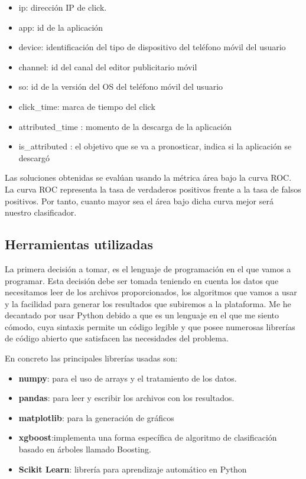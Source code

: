 \begin{itemize}
	
	\item ip: dirección IP de click.
	\item app: id de la aplicación
	\item device: identificación del tipo de dispositivo del teléfono móvil del usuario
	\item channel: id del canal del editor publicitario móvil
	\item so: id de la versión del OS del teléfono móvil del usuario
	\item click\_time: marca de tiempo del click 
	\item attributed\_time : momento de la descarga de la aplicación 
	\item is\_attributed : el objetivo que se va a pronosticar, indica si la aplicación se descargó
\end{itemize}

Las soluciones obtenidas se evalúan usando la métrica área bajo la curva ROC.
\medskip
La curva ROC representa la tasa de verdaderos positivos frente a la tasa de falsos positivos. Por tanto, cuanto mayor sea el área bajo dicha curva mejor será nuestro clasificador.


\subsection{Herramientas utilizadas}
La primera decisión a tomar, es el lenguaje de programación en el que vamos a programar. Esta decisión debe ser tomada teniendo en cuenta los datos que necesitamos leer de los archivos proporcionados, los algoritmos que vamos a usar y la facilidad para generar los resultados que subiremos a la plataforma. Me he decantado por usar Python debido a que es un lenguaje en el que me siento cómodo, cuya sintaxis permite un código legible y que posee numerosas librerías de código abierto que satisfacen las necesidades del problema.
\medskip

En concreto las principales librerías usadas son:
\begin{itemize}
	\item \textbf{numpy}: para el uso de arrays y el tratamiento de los datos.
	\item \textbf{pandas}: para leer y escribir los archivos con los resultados.
	\item \textbf{matplotlib}: para la generación de gráficos
	\item \textbf{xgboost}:implementa una forma específica de
	algoritmo de clasificación basado en árboles llamado Boosting.
	\item \textbf{Scikit Learn}: librería para aprendizaje automático en Python
\end{itemize}
